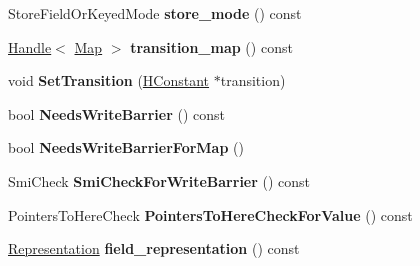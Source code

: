 \begin{DoxyCompactItemize}
\item 
Store\+Field\+Or\+Keyed\+Mode {\bfseries store\+\_\+mode} () const \hypertarget{classv8_1_1internal_1_1_h_store_named_field_a292b154ffaa5f34e6cff5e063aad7e88}{}\label{classv8_1_1internal_1_1_h_store_named_field_a292b154ffaa5f34e6cff5e063aad7e88}

\item 
\hyperlink{classv8_1_1internal_1_1_handle}{Handle}$<$ \hyperlink{classv8_1_1internal_1_1_map}{Map} $>$ {\bfseries transition\+\_\+map} () const \hypertarget{classv8_1_1internal_1_1_h_store_named_field_a5cd06a6a371f6548f14d30663b54efc9}{}\label{classv8_1_1internal_1_1_h_store_named_field_a5cd06a6a371f6548f14d30663b54efc9}

\item 
void {\bfseries Set\+Transition} (\hyperlink{classv8_1_1internal_1_1_h_constant}{H\+Constant} $\ast$transition)\hypertarget{classv8_1_1internal_1_1_h_store_named_field_a9636bf68ec002ca15d79d4199722ebdb}{}\label{classv8_1_1internal_1_1_h_store_named_field_a9636bf68ec002ca15d79d4199722ebdb}

\item 
bool {\bfseries Needs\+Write\+Barrier} () const \hypertarget{classv8_1_1internal_1_1_h_store_named_field_af8a0f4b296781b80a9e90a47edc0a6cb}{}\label{classv8_1_1internal_1_1_h_store_named_field_af8a0f4b296781b80a9e90a47edc0a6cb}

\item 
bool {\bfseries Needs\+Write\+Barrier\+For\+Map} ()\hypertarget{classv8_1_1internal_1_1_h_store_named_field_ac36bc8b806e22610880ee047d864a6ce}{}\label{classv8_1_1internal_1_1_h_store_named_field_ac36bc8b806e22610880ee047d864a6ce}

\item 
Smi\+Check {\bfseries Smi\+Check\+For\+Write\+Barrier} () const \hypertarget{classv8_1_1internal_1_1_h_store_named_field_adc205e8ad8e3a6fbb96fb8615af1b521}{}\label{classv8_1_1internal_1_1_h_store_named_field_adc205e8ad8e3a6fbb96fb8615af1b521}

\item 
Pointers\+To\+Here\+Check {\bfseries Pointers\+To\+Here\+Check\+For\+Value} () const \hypertarget{classv8_1_1internal_1_1_h_store_named_field_a5ac20ddbd6dc8b19216b9919313948c4}{}\label{classv8_1_1internal_1_1_h_store_named_field_a5ac20ddbd6dc8b19216b9919313948c4}

\item 
\hyperlink{classv8_1_1internal_1_1_representation}{Representation} {\bfseries field\+\_\+representation} () const \hypertarget{classv8_1_1internal_1_1_h_store_named_field_abf3758a50656d86099b0800f9dbb9c84}{}\label{classv8_1_1internal_1_1_h_store_named_field_abf3758a50656d86099b0800f9dbb9c84}


\end{DoxyCompactItemize}
